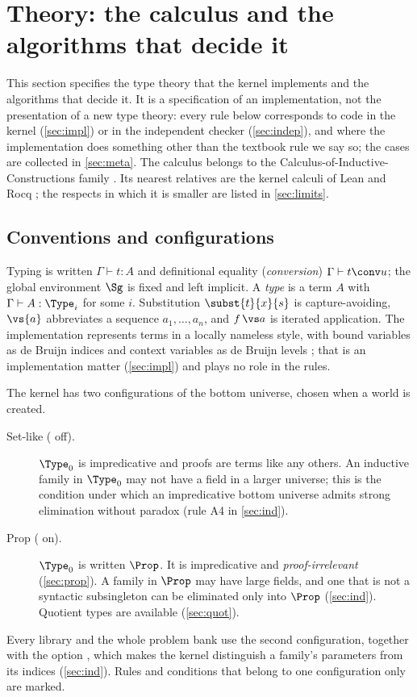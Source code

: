 \section{Theory: the calculus and the algorithms that decide it}\label{sec:theory}

This section specifies the type theory that the kernel implements and the algorithms that decide it.
It is a specification of an implementation, not the presentation of a new type theory: every rule below corresponds to code in the kernel (\cref{sec:impl}) or in the independent checker (\cref{sec:indep}), and where the implementation does something other than the textbook rule we say so; the cases are collected in \cref{sec:meta}.
The calculus belongs to the Calculus-of-Inductive-Constructions family \citep{coquand88cc,coquand90ind,paulin93}.
Its nearest relatives are the kernel calculi of Lean and Rocq \citep{carneiro19,rocq,sozeau20}; the respects in which it is smaller are listed in \cref{sec:limits}.

\subsection{Conventions and configurations}\label{sec:conventions}

Typing is written $\Gamma \vdash t : A$ and definitional equality (\emph{conversion}) $\Gamma \vdash t \conv u$; the global environment $\Sg$ is fixed and left implicit.
A \emph{type} is a term $A$ with $\Gamma \vdash A : \Type_i$ for some $i$.
Substitution $\subst{t}{x}{s}$ is capture-avoiding, $\vs{a}$ abbreviates a sequence $a_1,\dots,a_n$, and $f\,\vs a$ is iterated application.
The implementation represents terms in a locally nameless style, with bound variables as de Bruijn indices and context variables as de Bruijn levels \citep{debruijn72,mcbride04,chargueraud12}; that is an implementation matter (\cref{sec:impl}) and plays no role in the rules.

The kernel has two configurations of the bottom universe, chosen when a world is created.
\begin{description}
\item[Set-like ( off).] $\Type_0$ is impredicative and proofs are terms like any others.
  An inductive family in $\Type_0$ may not have a field in a larger universe; this is the condition under which an impredicative bottom universe admits strong elimination without paradox \citep{coquand86girard,hurkens95} (rule \textsc{A4} in \cref{sec:ind}).
\item[Prop ( on).] $\Type_0$ is written $\Prop$.
  It is impredicative and \emph{proof-irrelevant} (\cref{sec:prop}).
  A family in $\Prop$ may have large fields, and one that is not a syntactic subsingleton can be eliminated only into $\Prop$ (\cref{sec:ind}).
  Quotient types are available (\cref{sec:quot}).
\end{description}
Every library and the whole problem bank use the second configuration, together with the option , which makes the kernel distinguish a family's parameters from its indices (\cref{sec:ind}).
Rules and conditions that belong to one configuration only are marked.

